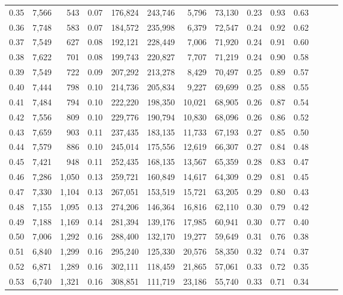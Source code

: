 \begin{tabular}{rrrrrrrrrrrrrr}
0.35 &  7,566 &    543 &  0.07 &  176,824 &  243,746 &   5,796 &  73,130 &  0.23 &  0.93 &      0.63 \\
0.36 &  7,748 &    583 &  0.07 &  184,572 &  235,998 &   6,379 &  72,547 &  0.24 &  0.92 &      0.62 \\
0.37 &  7,549 &    627 &  0.08 &  192,121 &  228,449 &   7,006 &  71,920 &  0.24 &  0.91 &      0.60 \\
0.38 &  7,622 &    701 &  0.08 &  199,743 &  220,827 &   7,707 &  71,219 &  0.24 &  0.90 &      0.58 \\
0.39 &  7,549 &    722 &  0.09 &  207,292 &  213,278 &   8,429 &  70,497 &  0.25 &  0.89 &      0.57 \\
0.40 &  7,444 &    798 &  0.10 &  214,736 &  205,834 &   9,227 &  69,699 &  0.25 &  0.88 &      0.55 \\
0.41 &  7,484 &    794 &  0.10 &  222,220 &  198,350 &  10,021 &  68,905 &  0.26 &  0.87 &      0.54 \\
0.42 &  7,556 &    809 &  0.10 &  229,776 &  190,794 &  10,830 &  68,096 &  0.26 &  0.86 &      0.52 \\
0.43 &  7,659 &    903 &  0.11 &  237,435 &  183,135 &  11,733 &  67,193 &  0.27 &  0.85 &      0.50 \\
0.44 &  7,579 &    886 &  0.10 &  245,014 &  175,556 &  12,619 &  66,307 &  0.27 &  0.84 &      0.48 \\
0.45 &  7,421 &    948 &  0.11 &  252,435 &  168,135 &  13,567 &  65,359 &  0.28 &  0.83 &      0.47 \\
0.46 &  7,286 &  1,050 &  0.13 &  259,721 &  160,849 &  14,617 &  64,309 &  0.29 &  0.81 &      0.45 \\
0.47 &  7,330 &  1,104 &  0.13 &  267,051 &  153,519 &  15,721 &  63,205 &  0.29 &  0.80 &      0.43 \\
0.48 &  7,155 &  1,095 &  0.13 &  274,206 &  146,364 &  16,816 &  62,110 &  0.30 &  0.79 &      0.42 \\
0.49 &  7,188 &  1,169 &  0.14 &  281,394 &  139,176 &  17,985 &  60,941 &  0.30 &  0.77 &      0.40 \\
0.50 &  7,006 &  1,292 &  0.16 &  288,400 &  132,170 &  19,277 &  59,649 &  0.31 &  0.76 &      0.38 \\
0.51 &  6,840 &  1,299 &  0.16 &  295,240 &  125,330 &  20,576 &  58,350 &  0.32 &  0.74 &      0.37 \\
0.52 &  6,871 &  1,289 &  0.16 &  302,111 &  118,459 &  21,865 &  57,061 &  0.33 &  0.72 &      0.35 \\
0.53 &  6,740 &  1,321 &  0.16 &  308,851 &  111,719 &  23,186 &  55,740 &  0.33 &  0.71 &      0.34 \\

\end{tabular}
